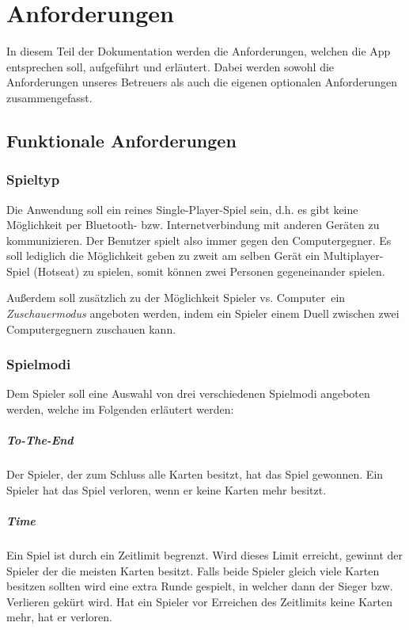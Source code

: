 \chapter{Anforderungen}
\label{cha:anforderungen}

In diesem Teil der Dokumentation werden die Anforderungen, welchen die App entsprechen soll, aufgeführt und erläutert. Dabei werden sowohl die Anforderungen unseres Betreuers als auch die eigenen optionalen Anforderungen zusammengefasst.

\section{Funktionale Anforderungen}
\label{sec:funtionaleanforderungen}

\subsection{Spieltyp}
Die Anwendung soll ein reines Single-Player-Spiel sein, d.h. es gibt keine Möglichkeit per Bluetooth- bzw. Internetverbindung mit anderen Geräten zu kommunizieren. Der Benutzer spielt also immer gegen den Computergegner. Es soll lediglich die Möglichkeit geben zu zweit am selben Gerät ein Multiplayer-Spiel (Hotseat) zu spielen, somit können zwei Personen gegeneinander spielen.

Außerdem soll zusätzlich zu der Möglichkeit \glqq Spieler vs. Computer\grqq\ ein \emph{Zuschauermodus} angeboten werden, indem ein Spieler einem Duell zwischen zwei Computergegnern zuschauen kann.

\subsection{Spielmodi}
Dem Spieler soll eine Auswahl von drei verschiedenen Spielmodi angeboten werden, welche im Folgenden erläutert werden:
\paragraph{To-The-End}
Der Spieler, der zum Schluss alle Karten besitzt, hat das Spiel gewonnen. Ein Spieler hat das Spiel verloren, wenn er keine Karten mehr besitzt.
\paragraph{Time}
Ein Spiel ist durch ein Zeitlimit begrenzt. Wird dieses Limit erreicht, gewinnt der Spieler der die meisten Karten besitzt. Falls beide Spieler gleich viele Karten besitzen sollten wird eine extra Runde gespielt, in welcher dann der Sieger bzw. Verlieren gekürt wird. Hat ein Spieler vor Erreichen des Zeitlimits keine Karten mehr, hat er verloren.
